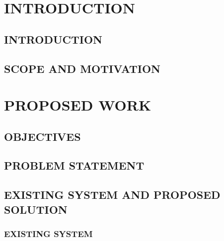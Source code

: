 \documentclass[a4paper,12pt]{report}
\begin{document}
\newpage
\newpage

\listoffigures
{}







\newpage
\renewcommand\thepage{\arabic{page}}

\clearpage

\setlength{\headheight}{15pt}

\pagestyle{fancy}
\fancyhf{}
\rhead{\changefont\rightmark}
\cfoot{\thepage}
\renewcommand{\chaptermark}[1]{%
    \markboth{#1}{}}
\renewcommand{\sectionmark}[1]{%
    \markright{#1}{}}
\renewcommand{\headrulewidth}{0.5pt}

\setcounter{page}{1}
\chapter{INTRODUCTION}
\vspace{-1 cm}

\section{INTRODUCTION}
\noindent

\section{SCOPE AND MOTIVATION}
\noindent




\chapter{PROPOSED WORK}
\vspace{-1 cm}
\noindent
\section{OBJECTIVES}
\section{PROBLEM STATEMENT}
\section{EXISTING SYSTEM AND PROPOSED SOLUTION}
\subsection{EXISTING SYSTEM}
\end{document}

